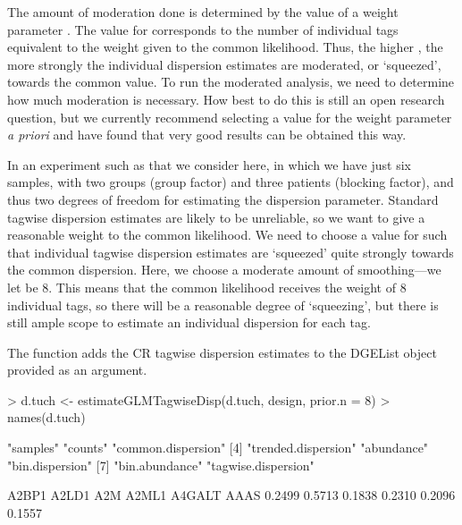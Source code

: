 The amount of moderation done is determined by the value of a weight
parameter . The value for  corresponds to
the number of individual tags equivalent to the weight given to the
common likelihood. Thus, the higher , the more strongly
the individual dispersion estimates are moderated, or `squeezed',
towards the common value. To run the moderated analysis, we need to
determine how much moderation is necessary. How best to do this is
still an open research question, but we currently recommend selecting
a value for the weight parameter  \emph{a priori} and
have found that very good results can be obtained this way.

In an experiment such as that we consider here, in which we have just
six samples, with two groups (group factor) and three patients
(blocking factor), and thus two degrees of freedom for estimating the
dispersion parameter. Standard tagwise dispersion estimates are likely
to be unreliable, so we want to give a reasonable weight to the common
likelihood. We need to choose a value for  such that
individual tagwise dispersion estimates are `squeezed' quite strongly
towards the common dispersion. Here, we choose a moderate amount of
smoothing---we let  be $8$. This means that the common
likelihood receives the weight of $8$ individual tags, so there will
be a reasonable degree of `squeezing', but there is still ample scope
to estimate an individual dispersion for each tag.

The function  adds the CR tagwise
dispersion estimates to the DGEList object provided as an argument.

\begin{Schunk}
\begin{Sinput}
> d.tuch <- estimateGLMTagwiseDisp(d.tuch, design, prior.n = 8)
> names(d.tuch)
\end{Sinput}
\begin{Soutput}
[1] "samples"            "counts"             "common.dispersion" 
[4] "trended.dispersion" "abundance"          "bin.dispersion"    
[7] "bin.abundance"      "tagwise.dispersion"
\end{Soutput}
\begin{Soutput}
 A2BP1  A2LD1    A2M  A2ML1 A4GALT   AAAS 
0.2499 0.5713 0.1838 0.2310 0.2096 0.1557 
\end{Soutput}
\end{Schunk}

